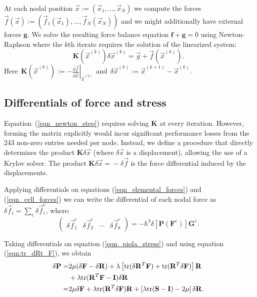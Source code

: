 At each nodal position $\vec{x}:=(\vec{x}_1,\ldots,\vec{x}_N)$ we compute the
forces $\vec{f}(\vec{x}):=(\vec{f}_1(\vec{x}_1),\ldots,\vec{f}_N(\vec{x}_N))$
and we might additionally have external forces $\mathbf{g}$. We solve
the resulting force balance equation $\mathbf{f}+\mathbf{g}=0$ using
Newton-Raphson where the $k$th iterate requires the solution of the linearized
system:
\begin{equation}
\mathbf{K}(\vec{x}^{(k)})\delta\vec{x}^{(k)}=\vec{g}+\vec{f}(\vec{x}^{(k)}).
\label{eqn_newton_step}
\end{equation}
$
\mbox{Here}\ \ 
\mathbf{K}(\vec{x}^{(k)}):=-\left.\frac{\partial\vec{f}}{\partial\vec{x}}\right|_{\vec{x}^{(k)}}
\ \ \mbox{and}\ \ 
\delta\vec{x}^{(k)}:=\vec{x}^{(k+1)}\!-\!\vec{x}^{(k)}
$.

\subsection{Differentials of force and stress}


Equation~(\ref{eqn_newton_step}) requires solving $\mathbf{K}$ at every
iteration. However, forming the matrix explicitly would incur significant performance losses from the 243 non-zero entries needed per node. Instead, we define a procedure that directly
determines the product $\mathbf{K}\delta\vec{x}$ (where $\delta\vec{x}$ is a
displacement), allowing the use of a Krylov solver. The product
$\mathbf{K}\delta\vec{x}\!=\!-\delta\vec{f}$ is the force differential induced
by the displacements.



Applying differentials on equations (\ref{eqn_elemental_forces}) and (\ref{eqn_cell_forces}) we can write the differential of each nodal force
as $\delta\vec{f}_i\!=\!\sum_e\delta\vec{f}_i^e$, where:
\begin{equation}
\left(
\begin{array}{cccc}
\delta\vec{f}_1^e &
\delta\vec{f}_2^e &
\cdots &
\delta\vec{f}_8^e
\end{array}
\right)
=-h^3\delta\left[\mathbf{P}(\mathbf{F}^e)\right]\mathbf{G}^e.
\label{eqn_elemental_force_differentials}
\end{equation}

Taking differentials on equation (\ref{eqn_piola_stress}) and using
equation (\ref{eqn:tr_dRt_F}), we obtain
\begin{align}
  \delta\mathbf{P}=&2\mu(\delta\mathbf{F}-\delta\mathbf{R})+\lambda\left[\mbox{tr}(\delta\mathbf{R}^T\mathbf{F})
  +\mbox{tr}(\mathbf{R}^T\delta\mathbf{F})\right]\mathbf{R}\nonumber \\ 
  &+\lambda\mbox{tr}(\mathbf{R}^T\mathbf{F}-\mathbf{I})\delta\mathbf{R} \nonumber \\
  =&2\mu\delta\mathbf{F}+\lambda\mbox{tr}(\mathbf{R}^T\delta\mathbf{F})\mathbf{R}
  +\left[\lambda\mbox{tr}(\mathbf{S}-\mathbf{I})-2\mu\right]\delta\mathbf{R}. \label{eqn_stress_differential}
\end{align}

